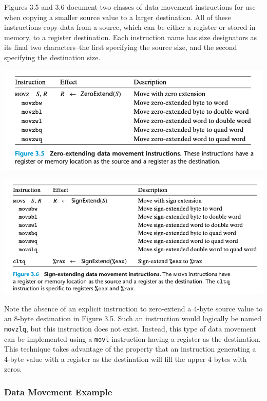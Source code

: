 \documentclass[11pt]{article}
\begin{document}
Figures 3.5 and 3.6 document two classes of data movement instructions for use when copying a smaller source value to a larger destination. All of these instructions copy data from a source, which can be either a register or stored in memory, to a register destination. Each instruction name has size designators as its final two characters--the first specifying the source size, and the second specifying the destination size.\\
\begin{center}
\includegraphics[width=.9\linewidth]{pics/zero-extending-data-movement-instructions.png}
\end{center}

\begin{center}
\includegraphics[width=.9\linewidth]{pics/sign-extending-data-movement-instructions.png}
\end{center}



Note the absence of an explicit instruction to zero-extend a 4-byte source value to an 8-byte destination in Figure 3.5. Such an instruction would logically be named \texttt{movzlq}, but this instruction does not exist. Instead, this type of data movement can be implemented using a \texttt{movl} instruction having a register as the destination. This technique takes advantage of the property that an instruction generating a 4-byte value with a register as the destination will fill the upper 4 bytes with zeros.\\

\subsubsection{Data Movement Example}
\label{sec:org5d803f8}
\end{document}
